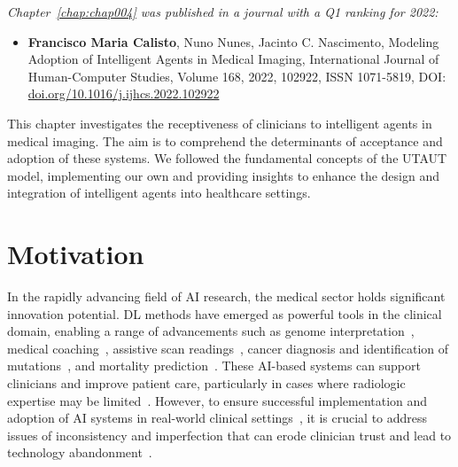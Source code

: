 \clearpage
\label{chap:chap004}

\vspace{0.5mm}

\noindent
{\it Chapter~\ref{chap:chap004} was published in a journal with a Q1 ranking for 2022:}

\vspace{0.5mm}

\begin{itemize}
\item {\bf Francisco Maria Calisto}, Nuno Nunes, Jacinto C. Nascimento, Modeling Adoption of Intelligent Agents in Medical Imaging, International Journal of Human-Computer Studies, Volume 168, 2022, 102922, ISSN 1071-5819, DOI: \href{https://doi.org/10.1016/j.ijhcs.2022.102922}{doi.org/10.1016/j.ijhcs.2022.102922}
\end{itemize}

This chapter investigates the receptiveness of clinicians to intelligent agents in medical imaging.
The aim is to comprehend the determinants of acceptance and adoption of these systems.
We followed the fundamental concepts of the \ac{UTAUT} model, implementing our own and providing insights to enhance the design and integration of intelligent agents into healthcare settings.

\section{Motivation}
\label{sec:chap004001}

In the rapidly advancing field of \ac{AI} research, the medical sector holds significant innovation potential.
\ac{DL} methods have emerged as powerful tools in the clinical domain, enabling a range of advancements such as genome interpretation~\cite{sundaram2018predicting}, medical coaching~\cite{CALISTO2022102285}, assistive scan readings~\cite{madani2018deep}, cancer diagnosis and identification of mutations~\cite{Sollini2020}, and mortality prediction~\cite{ahmad2018death}.
These \ac{AI}-based systems can support clinicians and improve patient care, particularly in cases where radiologic expertise may be limited~\cite{doi:10.1148/radiol.2020201874, doi:10.1148/radiol.2020190283}.
However, to ensure successful implementation and adoption of \ac{AI} systems in real-world clinical settings~\cite{Kocielnik:2019:YAI:3290605.3300641}, it is crucial to address issues of inconsistency and imperfection that can erode clinician trust and lead to technology abandonment~\cite{CALISTO2021102607, CALISTO2022102285}.

